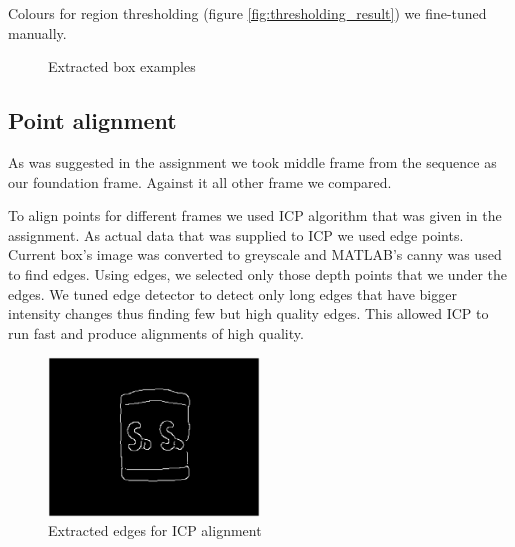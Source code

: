 \documentclass{article}
\begin{document}
Colours for region thresholding (figure \ref{fig:thresholding_result}) we fine-tuned manually.



\begin{figure}[h!]
    \centering
      \caption{Extracted box examples}
\end{figure}

\subsection{Point alignment}
As was suggested in the assignment we took middle frame
from the sequence as our foundation frame. Against it all
other frame we compared.

To align points for different frames we used ICP algorithm
that was given in the assignment. As actual data that was 
supplied to ICP we used edge points. Current box's image
was converted to greyscale and MATLAB's canny was used
to find edges. Using edges, we selected only those
depth points that we under the edges. We tuned edge
detector to detect only long edges that have bigger
intensity changes thus finding few but high quality edges.
This allowed ICP to run fast and produce alignments
of high quality.

\begin{figure}[h!]
  \centering
  \includegraphics[width=0.5\textwidth]{figs/extracted_edge_mask}
  \caption{Extracted edges for ICP alignment}
  \label{fig:extracted_edge_mask}
\end{figure}
\end{document}
